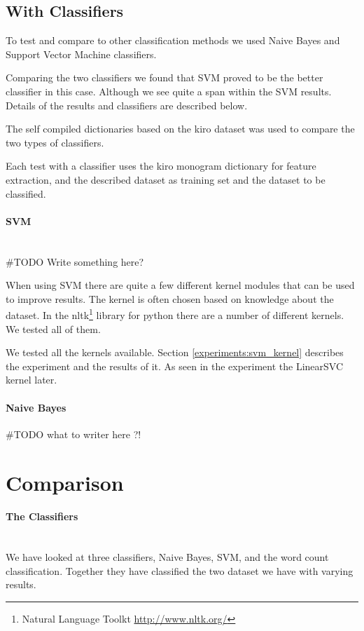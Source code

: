 \subsection{With Classifiers}\label{sentiment:classifier_classification}
To test and compare to other classification methods we used Naive Bayes and
Support Vector Machine classifiers. 

Comparing the two classifiers we found that SVM proved to be the better
classifier in this case. Although we see quite a span within the SVM results.
Details of the results and classifiers are described below.  

The self compiled dictionaries based on the kiro dataset was used to compare
the two types of classifiers. 

Each test with a classifier uses the kiro monogram dictionary for feature
extraction, and the described dataset as training set and the dataset to be
classified. 

\paragraph{SVM}\label{sentiment:svm_classification}
\hspace{0pt}\\
#TODO Write something here?

When using SVM there are quite a few different kernel modules that can be used
to improve results. The kernel is often chosen based on knowledge about the
dataset. In the nltk\footnote{Natural Language Toolkt
\url{http://www.nltk.org/}} library for python there are a number of different
kernels. We tested all of them.  

We tested all the kernels available. Section \ref{experiments:svm_kernel}
describes the experiment and the results of it. 
As seen in the experiment the LinearSVC kernel later. 
%

\paragraph{Naive Bayes}\label{sentiment:naive_bayes_classification}
#TODO what to writer here ?!
%

\section{Comparison}\label{sentiment:comparison_results}
\paragraph{The Classifiers}
\hspace{0pt}\\
We have looked at three classifiers, Naive Bayes, SVM, and the word count
classification. Together they have classified the two dataset we have with
varying results. 


